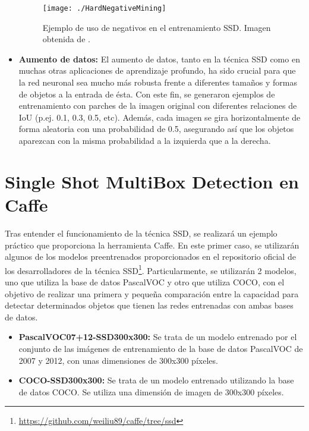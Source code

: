 \documentclass[a4paper, 12pt, spanish, chapterprefix, numbers=noenddot]{book}
\begin{document}
\begin{itemize}
\begin{figure}[H]
\begin{center}
\texttt{[image: ./HardNegativeMining]}
\caption{Ejemplo de uso de negativos en el entrenamiento SSD. Imagen obtenida de \cite{SSD_2}.}
\label{VGG-16}
\end{center}
\end{figure}

\item \textbf{Aumento de datos:} El aumento de datos, tanto en la técnica SSD como en muchas otras aplicaciones de aprendizaje profundo, ha sido crucial para que la red neuronal sea mucho más robusta frente a diferentes tamaños y formas de objetos a la entrada de ésta. Con este fin, se generaron ejemplos de entrenamiento con parches de la imagen original con diferentes relaciones de IoU (p.ej. 0.1, 0.3, 0.5, etc). Además, cada imagen se gira horizontalmente de forma aleatoria con una probabilidad de 0.5, asegurando así que los objetos aparezcan con la misma probabilidad a la izquierda que a la derecha. 
\end{itemize}

\section{Single Shot MultiBox Detection en Caffe}\label{SSDCaffe}

Tras entender el funcionamiento de la técnica SSD, se realizará un ejemplo práctico que proporciona la herramienta Caffe. En este primer caso, se utilizarán algunos de los modelos preentrenados proporcionados en el repositorio oficial de los desarrolladores de la técnica SSD\footnote{\url{https://github.com/weiliu89/caffe/tree/ssd}}. Particularmente, se utilizarán 2 modelos, uno que utiliza la base de datos PascalVOC y otro que utiliza COCO, con el objetivo de realizar una primera y pequeña comparación entre la capacidad para detectar determinados objetos que tienen las redes entrenadas con ambas bases de datos.

\begin{itemize}
\item \textbf{PascalVOC07+12-SSD300x300:} Se trata de un modelo entrenado por el conjunto de las imágenes de entrenamiento de la base de datos PascalVOC de 2007 y 2012, con unas dimensiones de 300x300 píxeles.
\item \textbf{COCO-SSD300x300:} Se trata de un modelo entrenado utilizando la base de datos COCO. Se utiliza una dimensión de imagen de 300x300 píxeles.
\end{itemize}
\end{document}
